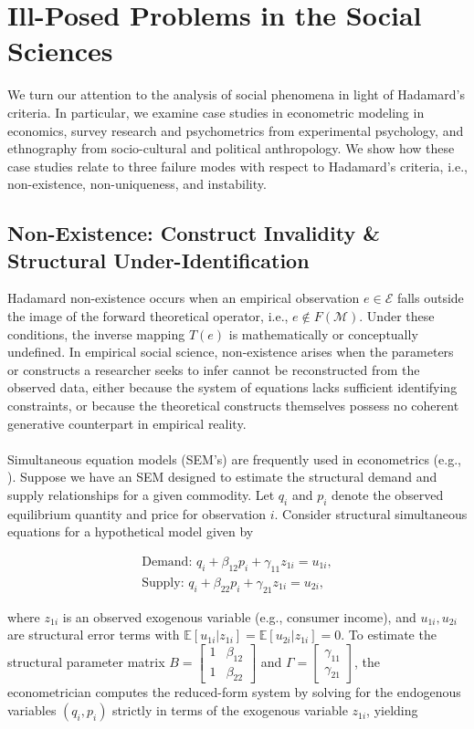 \documentclass{article}
\theoremstyle{definition}
\begin{document}
\section{Ill-Posed Problems in the Social Sciences}

We turn our attention to the analysis of social phenomena in light of Hadamard's criteria. In particular, we examine case studies in econometric modeling in economics, survey research and psychometrics from experimental psychology, and ethnography from socio-cultural and political anthropology. We show how these case studies relate to three failure modes with respect to Hadamard's criteria, i.e., non-existence, non-uniqueness, and instability.

\subsection{Non-Existence: Construct Invalidity \& Structural Under-Identification}

Hadamard non-existence occurs when an empirical observation $e \in \mathcal{E}$ falls outside the image of the forward theoretical operator, i.e., $e \notin F(\mathcal{M})$. Under these conditions, the inverse mapping $T(e)$ is mathematically or conceptually undefined. In empirical social science, non-existence arises when the parameters or constructs a researcher seeks to infer cannot be reconstructed from the observed data, either because the system of equations lacks sufficient identifying constraints, or because the theoretical constructs themselves possess no coherent generative counterpart in empirical reality. \\
\\
Simultaneous equation models (SEM's) are frequently used in econometrics (e.g., \cite{Sal83}). Suppose we have an SEM designed to estimate the structural demand and supply relationships for a given commodity. Let $q_i$ and $p_i$ denote the observed equilibrium quantity and price for observation $i$. Consider structural simultaneous equations for a hypothetical model given by

\begin{align*}
    \text{Demand: } q_i + \beta_{12} p_i + \gamma_{11} z_{1i} = u_{1i}, \\
    \text{Supply: } q_i + \beta_{22} p_i + \gamma_{21} z_{1i} = u_{2i},
\end{align*}

\noindent
where $z_{1i}$ is an observed exogenous variable (e.g., consumer income), and $u_{1i}, u_{2i}$ are structural error terms with $\mathbb{E}[u_{1i}\vert{}z_{1i}] = \mathbb{E}[u_{2i}\vert{}z_{1i}] = 0$. To estimate the structural parameter matrix $B = \begin{bmatrix} 1 & \beta_{12} \\ 1 & \beta_{22} \end{bmatrix}$ and $\Gamma = \begin{bmatrix} \gamma_{11} \\ \gamma_{21} \end{bmatrix}$, the econometrician computes the reduced-form system by solving for the endogenous variables $(q_i, p_i)$ strictly in terms of the exogenous variable $z_{1i}$, yielding
\end{document}
